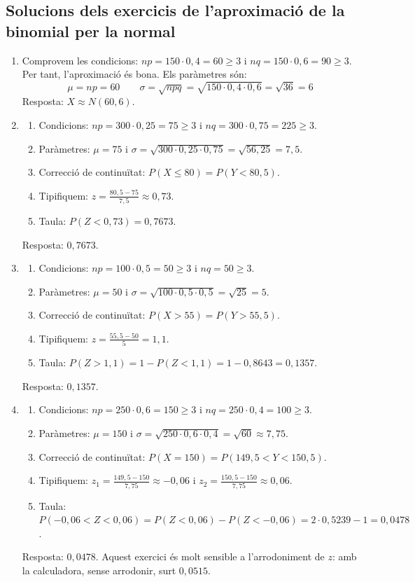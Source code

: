 \subsection{Solucions dels exercicis de l'aproximació de la binomial per la normal}
\begin{enumerate}
 \item Comprovem les condicions: $np=150\cdot0{,}4=60\geq3$ i $nq=150\cdot0{,}6=90\geq3$. Per tant, l'aproximació és bona. Els paràmetres són:
 $$\mu=np=60 \qquad \sigma=\sqrt{npq}=\sqrt{150\cdot0{,}4\cdot0{,}6}=\sqrt{36}=6$$
 Resposta: $X\approx N(60, 6)$.

 \item
 \begin{enumerate}[(1)]
  \item Condicions: $np=300\cdot0{,}25=75\geq3$ i $nq=300\cdot0{,}75=225\geq3$.
  \item Paràmetres: $\mu=75$ i $\sigma=\sqrt{300\cdot0{,}25\cdot0{,}75}=\sqrt{56{,}25}=7{,}5$.
  \item Correcció de continuïtat: $P(X\leq80)=P(Y<80{,}5)$.
  \item Tipifiquem: $z=\frac{80{,}5-75}{7{,}5}\approx0{,}73$.
  \item Taula: $P(Z<0{,}73)=0{,}7673$.
 \end{enumerate}
 Resposta: $0{,}7673$.

 \item
 \begin{enumerate}[(1)]
  \item Condicions: $np=100\cdot0{,}5=50\geq3$ i $nq=50\geq3$.
  \item Paràmetres: $\mu=50$ i $\sigma=\sqrt{100\cdot0{,}5\cdot0{,}5}=\sqrt{25}=5$.
  \item Correcció de continuïtat: $P(X>55)=P(Y>55{,}5)$.
  \item Tipifiquem: $z=\frac{55{,}5-50}{5}=1{,}1$.
  \item Taula: $P(Z>1{,}1)=1-P(Z<1{,}1)=1-0{,}8643=0{,}1357$.
 \end{enumerate}
 Resposta: $0{,}1357$.

 \item
 \begin{enumerate}[(1)]
  \item Condicions: $np=250\cdot0{,}6=150\geq3$ i $nq=250\cdot0{,}4=100\geq3$.
  \item Paràmetres: $\mu=150$ i $\sigma=\sqrt{250\cdot0{,}6\cdot0{,}4}=\sqrt{60}\approx7{,}75$.
  \item Correcció de continuïtat: $P(X=150)=P(149{,}5<Y<150{,}5)$.
  \item Tipifiquem: $z_1=\frac{149{,}5-150}{7{,}75}\approx-0{,}06$ i $z_2=\frac{150{,}5-150}{7{,}75}\approx0{,}06$.
  \item Taula: $P(-0{,}06<Z<0{,}06)=P(Z<0{,}06)-P(Z<-0{,}06)=2\cdot0{,}5239-1=0{,}0478$.
 \end{enumerate}
 Resposta: $0{,}0478$. Aquest exercici és molt sensible a l'arrodoniment de $z$: amb la calculadora, sense arrodonir, surt $0{,}0515$.


\end{enumerate}

